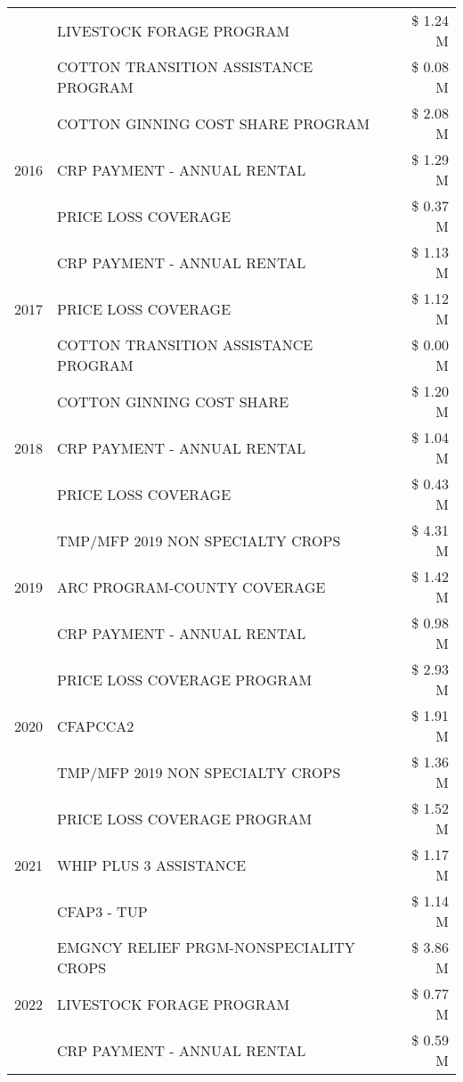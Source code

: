 \begin{tabular}{llr}
 & LIVESTOCK FORAGE PROGRAM & \$ 1.24 M \\
 & COTTON TRANSITION ASSISTANCE PROGRAM & \$ 0.08 M \\
\cline{1-3}
\multirow[t]{3}{*}{2016} & COTTON GINNING COST SHARE PROGRAM & \$ 2.08 M \\
 & CRP PAYMENT - ANNUAL RENTAL & \$ 1.29 M \\
 & PRICE LOSS COVERAGE & \$ 0.37 M \\
\cline{1-3}
\multirow[t]{3}{*}{2017} & CRP PAYMENT - ANNUAL RENTAL & \$ 1.13 M \\
 & PRICE LOSS COVERAGE & \$ 1.12 M \\
 & COTTON TRANSITION ASSISTANCE PROGRAM & \$ 0.00 M \\
\cline{1-3}
\multirow[t]{3}{*}{2018} & COTTON GINNING COST SHARE & \$ 1.20 M \\
 & CRP PAYMENT - ANNUAL RENTAL & \$ 1.04 M \\
 & PRICE LOSS COVERAGE & \$ 0.43 M \\
\cline{1-3}
\multirow[t]{3}{*}{2019} & TMP/MFP 2019 NON SPECIALTY CROPS & \$ 4.31 M \\
 & ARC PROGRAM-COUNTY COVERAGE & \$ 1.42 M \\
 & CRP PAYMENT - ANNUAL RENTAL & \$ 0.98 M \\
\cline{1-3}
\multirow[t]{3}{*}{2020} & PRICE LOSS COVERAGE PROGRAM & \$ 2.93 M \\
 & CFAPCCA2 & \$ 1.91 M \\
 & TMP/MFP 2019 NON SPECIALTY CROPS & \$ 1.36 M \\
\cline{1-3}
\multirow[t]{3}{*}{2021} & PRICE LOSS COVERAGE PROGRAM & \$ 1.52 M \\
 & WHIP PLUS 3 ASSISTANCE & \$ 1.17 M \\
 & CFAP3 - TUP & \$ 1.14 M \\
\cline{1-3}
\multirow[t]{3}{*}{2022} & EMGNCY RELIEF PRGM-NONSPECIALITY CROPS & \$ 3.86 M \\
 & LIVESTOCK FORAGE PROGRAM & \$ 0.77 M \\
 & CRP PAYMENT - ANNUAL RENTAL & \$ 0.59 M \\
\cline{1-3}
\bottomrule
\end{tabular}
